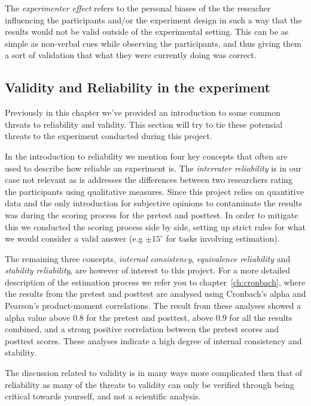 	\bigskip\noindent
	The \textit{experimenter effect} refers to the personal biases of the the reseacher influencing the participants and/or the experiment design in such a way that the results would not be valid outside of the experimental setting. This can be as simple as non-verbal cues while observing the participants, and thus giving them a sort of validation that what they were currently doing was correct. 
	
	
\subsection*{Validity and Reliability in the experiment}
	Previously in this chapter we've provided an introduction to some common threats to reliability and validity. This section will try to tie these potensial threats to the experiment conducted during this project. 
	
	\bigskip\noindent
	In the introduction to reliability we mention four key concepts that often are used to describe how reliable an experiment is. The \textit{interrater reliability} is in our case not relevant as is addresses the differences between two researchers rating the participants using qualitative measures. Since this project relies on quantitive data and the only introduction for subjective opinions to contaminate the results was during the scoring process for the pretest and posttest. In order to mitigate this we conducted the scoring process side by side, setting up strict rules for what we would consider a valid answer (e.g $\pm 15^{\circ}$ for tasks involving estimation).
	
	\bigskip\noindent
	The remaining three concepts, \textit{internal consistency}, \textit{equivalence reliability} and \textit{stability reliability}, are however of interest to this project. 
	For a more detailed description of the estimation process we refer you to chapter~\ref{ch:cronbach}, where the results from the pretest and posttest are analysed using Cronbach's alpha and Pearson's product-moment correlations. The result from these analyses showed a alpha value above $0.8$ for the pretest and posttest, above $0.9$ for all the results combined, and a strong positive correlation between the pretest scores and posttest scores. These analyses indicate a high degree of internal consistency and stability.
	
	\bigskip\noindent
	The discussion related to validity is in many ways more complicated then that of reliability as many of the threats to validity can only be verified through being critical towards yourself, and not a scientific analysis. 
	
